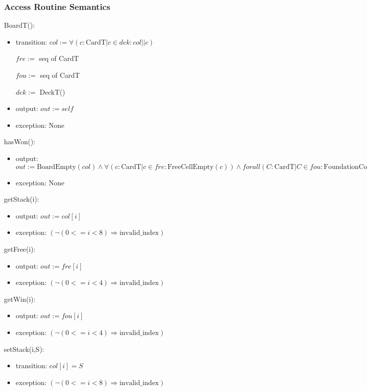 \documentclass[12pt]{article}
\newcommand{\means}{\Rightarrow}
\newcommand{\m}[1]{\mbox{#1}}
\begin{document}
\subsubsection* {Access Routine Semantics}

BoardT():
\begin{itemize}
    \item transition: $col := \forall(c : \mbox{CardT} | c \in dek : col||c)$

    \hspace{1.8cm} $fre :=$ seq of CardT

    \hspace{1.8cm} $fou :=$ seq of CardT

    \hspace{1.8cm} $dek :=$ DeckT()
    \item output: $out := \mathit{self}$
    \item exception: None
\end{itemize}

\noindent hasWon():
\begin{itemize}
  \item output: $out := \m{BoardEmpty}(col) \land \forall(c:\m{CardT}|c \in fre : \m{FreeCellEmpty}(c)) \land forall(C:\m{CardT}|C \in fou : \m{FoundationComplete}(C))$
  \item exception: None
\end{itemize}

\noindent getStack(i):
\begin{itemize}
  \item output: $out := col[i]$
  \item exception: $(\lnot (0<=i<8) \means \m{invalid\_index})$
\end{itemize}

\noindent getFree(i):
\begin{itemize}
  \item output: $out := fre[i]$
  \item exception: $(\lnot (0<=i<4) \means \m{invalid\_index})$
\end{itemize}

\noindent getWin(i):
\begin{itemize}
  \item output: $out := fou[i]$
  \item exception: $(\lnot (0<=i<4) \means \m{invalid\_index})$
\end{itemize}

\noindent setStack(i,S):
\begin{itemize}
  \item transition: $col[i]=S$
  \item exception: $(\lnot (0<=i<8) \means \m{invalid\_index})$
\end{itemize}
\end{document}
